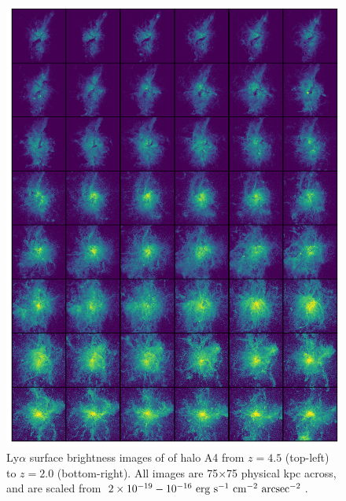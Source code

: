 \begin{figure}
    \centering
    \includegraphics[width=\textwidth,keepaspectratio]{figures/rogues_A4.png}
    \caption{
        Ly$\alpha$ surface brightness images of of halo A4 from $z=4.5$ (top-left) to $z=2.0$ (bottom-right).
        All images are 75$\times$75 physical kpc across, and are scaled from $2\times10^{-19}-10^{-16}\ \rm{erg}\ \rm{s}^{-1}\ \rm{cm}^{-2}\ \rm{arcsec}^{-2}$.
    }
  \label{fig:rogues4}
\end{figure}

